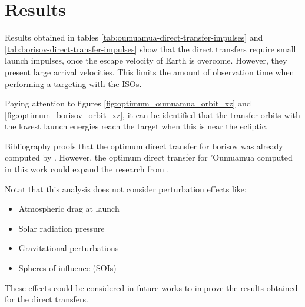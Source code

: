 \section{Results}

Results obtained in tables \ref{tab:oumuamua-direct-transfer-impulses} and
\ref{tab:borisov-direct-transfer-impulses} show that the direct transfers
require small launch impulses, once the escape velocity of Earth is overcome.
However, they present large arrival velocities. This limits the amount of
observation time when performing a targeting with the ISOs.

Paying attention to figures \ref{fig:optimum_oumuamua_orbit_xz} and
\ref{fig:optimum_borisov_orbit_xz}, it can be identified that the transfer
orbits with the lowest launch energies reach the target when this is near the
ecliptic.

Bibliography proofs that the optimum direct transfer for borisov was already
computed by \cite{hibberd2021}. However, the optimum direct transfer for
'Oumuamua computed in this work could expand the research from \cite{hein2018}.

Notat that this analysis does not consider perturbation effects like:

\begin{itemize}
  \item Atmospheric drag at launch
  \item Solar radiation pressure
  \item Gravitational perturbations
  \item Spheres of influence (SOIs)
\end{itemize}

These effects could be considered in future works to improve the results
obtained for the direct transfers.
